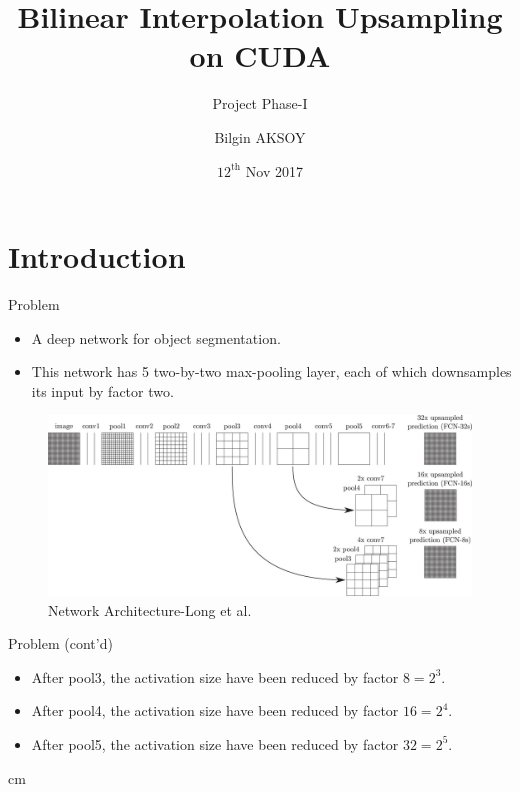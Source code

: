 \documentclass{beamer}
\title[Applied Parallel Programming]{Bilinear Interpolation Upsampling on CUDA}
\subtitle{Project Phase-I}
\author{Bilgin AKSOY}
\institute{\bf Informatics Enstitute}
\date{$12^{\text{th}}$ Nov 2017}
\begin{document}
	\begin{frame}
	  \titlepage
	\end{frame}

\section{Introduction}

	\begin{frame}{Problem}
		
		\begin{itemize}
		  \item A deep network for object segmentation.  
		  \item \justifying This network has 5 two-by-two max-pooling layer, each of which downsamples its input by factor two. 
		\end{itemize}
		\begin{figure}
		  \includegraphics[scale=0.15]{./Figures/DAGnet.jpg}
		  \caption{\label{fig:DAGnet}Network Architecture-Long et al.\cite{long2015fully}}
		\end{figure}	
	\end{frame}
	\begin{frame}{Problem (cont'd)}
		\begin{itemize}
				\item After pool3, the activation size have been reduced by factor $8= 2^3 $.
				\item After pool4, the activation size have been reduced by factor $16= 2^4 $.
				\item After pool5, the activation size have been reduced by factor $32= 2^5 $.
		\end{itemize}
		\vskip 5 cm
	\end{frame}
\end{document}
